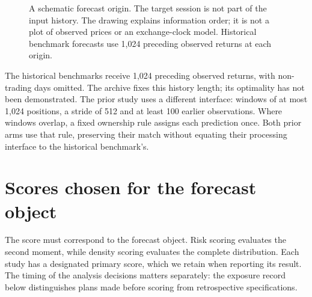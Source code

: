 \begin{figure}[htbp]
\centering
{}
\caption[Forecast timing and information availability]{A schematic forecast origin. The target session is not part of the input history. The drawing explains information order; it is not a plot of observed prices or an exchange-clock model. Historical benchmark forecasts use 1,024 preceding observed returns at each origin.}
\label{fig:forecast_origin}
\end{figure}

The historical benchmarks receive 1,024 preceding observed returns, with non-trading days omitted. The archive fixes this history length; its optimality has not been demonstrated. The prior study uses a different interface: windows of at most 1,024 positions, a stride of 512 and at least 100 earlier observations. Where windows overlap, a fixed ownership rule assigns each prediction once. Both prior arms use that rule, preserving their match without equating their processing interface to the historical benchmark's.

\section{Scores chosen for the forecast object}

The score must correspond to the forecast object. Risk scoring evaluates the second moment, while density scoring evaluates the complete distribution. Each study has a designated primary score, which we retain when reporting its result. The timing of the analysis decisions matters separately: the exposure record below distinguishes plans made before scoring from retrospective specifications.

